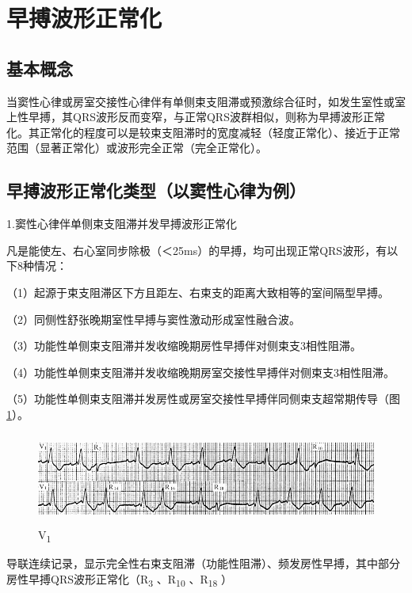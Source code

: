 \protect\hypertarget{text00018.htmlux5cux23subid163}{}{}

\section{早搏波形正常化}

\protect\hypertarget{text00018.htmlux5cux23subid164}{}{}

\subsection{基本概念}

当窦性心律或房室交接性心律伴有单侧束支阻滞或预激综合征时，如发生室性或室上性早搏，其QRS波形反而变窄，与正常QRS波群相似，则称为早搏波形正常化。其正常化的程度可以是较束支阻滞时的宽度减轻（轻度正常化）、接近于正常范围（显著正常化）或波形完全正常（完全正常化）。

\protect\hypertarget{text00018.htmlux5cux23subid165}{}{}

\subsection{早搏波形正常化类型（以窦性心律为例）}

1.窦性心律伴单侧束支阻滞并发早搏波形正常化

凡是能使左、右心室同步除极（＜25ms）的早搏，均可出现正常QRS波形，有以下8种情况：

（1）起源于束支阻滞区下方且距左、右束支的距离大致相等的室间隔型早搏。

（2）同侧性舒张晚期室性早搏与窦性激动形成室性融合波。

（3）功能性单侧束支阻滞并发收缩晚期房性早搏伴对侧束支3相性阻滞。

（4）功能性单侧束支阻滞并发收缩晚期房室交接性早搏伴对侧束支3相性阻滞。

（5）功能性单侧束支阻滞并发房性或房室交接性早搏伴同侧束支超常期传导（图\ref{fig11-30}）。

\begin{figure}[!htbp]
 \centering
 \includegraphics[width=5.58333in,height=1.1875in]{./images/Image00193.jpg}
 \captionsetup{justification=centering}
 \caption{V\textsubscript{1}}
 \label{fig11-30}
  \end{figure} 
导联连续记录，显示完全性右束支阻滞（功能性阻滞）、频发房性早搏，其中部分房性早搏QRS波形正常化（R\textsubscript{3}
、R\textsubscript{10} 、R\textsubscript{18} ）

